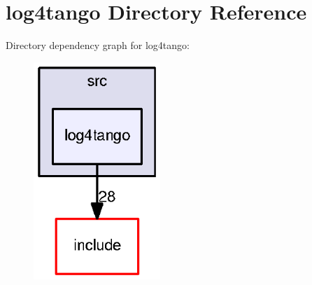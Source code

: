 \section{log4tango Directory Reference}
\label{dir_0201b00d8bb20bc5eeb74a5962480c4f}
Directory dependency graph for log4tango\-:
\nopagebreak
\begin{figure}[H]
\begin{center}
\leavevmode
\includegraphics[width=136pt]{dir_0201b00d8bb20bc5eeb74a5962480c4f_dep}
\end{center}
\end{figure}
